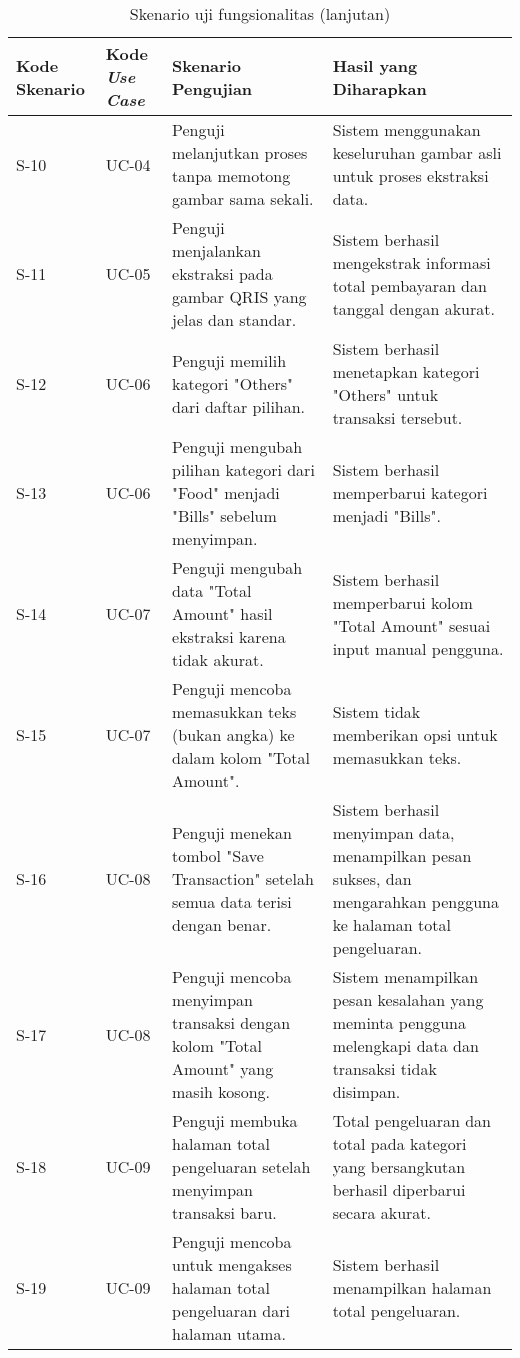 \begin{table}[h!]
\ContinuedFloat
\caption{Skenario uji fungsionalitas (lanjutan)}
\begin{tabularx}{\linewidth}{|p{1.5cm}|p{1.5cm}|p{4.5cm}|X|}
\hline
\textbf{Kode Skenario} & \textbf{Kode \emph{Use Case}} & \textbf{Skenario Pengujian} & \textbf{Hasil yang Diharapkan} \\
\hline
S-10 & UC-04 & Penguji melanjutkan proses tanpa memotong gambar sama sekali. & Sistem menggunakan keseluruhan gambar asli untuk proses ekstraksi data. \\
\hline
S-11 & UC-05 & Penguji menjalankan ekstraksi pada gambar QRIS yang jelas dan standar. & Sistem berhasil mengekstrak informasi total pembayaran dan tanggal dengan akurat. \\
\hline
S-12 & UC-06 & Penguji memilih kategori "Others" dari daftar pilihan. & Sistem berhasil menetapkan kategori "Others" untuk transaksi tersebut. \\
\hline
S-13 & UC-06 & Penguji mengubah pilihan kategori dari "Food" menjadi "Bills" sebelum menyimpan. & Sistem berhasil memperbarui kategori menjadi "Bills". \\
\hline
S-14 & UC-07 & Penguji mengubah data "Total Amount" hasil ekstraksi karena tidak akurat. & Sistem berhasil memperbarui kolom "Total Amount" sesuai input manual pengguna. \\
\hline
S-15 & UC-07 & Penguji mencoba memasukkan teks (bukan angka) ke dalam kolom "Total Amount". & Sistem tidak memberikan opsi untuk memasukkan teks. \\
\hline
S-16 & UC-08 & Penguji menekan tombol "Save Transaction" setelah semua data terisi dengan benar. & Sistem berhasil menyimpan data, menampilkan pesan sukses, dan mengarahkan pengguna ke halaman total pengeluaran. \\
\hline
S-17 & UC-08 & Penguji mencoba menyimpan transaksi dengan kolom "Total Amount" yang masih kosong. & Sistem menampilkan pesan kesalahan yang meminta pengguna melengkapi data dan transaksi tidak disimpan. \\
\hline
S-18 & UC-09 & Penguji membuka halaman total pengeluaran setelah menyimpan transaksi baru. & Total pengeluaran dan total pada kategori yang bersangkutan berhasil diperbarui secara akurat. \\
\hline
S-19 & UC-09 & Penguji mencoba untuk mengakses halaman total pengeluaran dari halaman utama. & Sistem berhasil menampilkan halaman total pengeluaran. \\
\hline
\end{tabularx}
\end{table}

